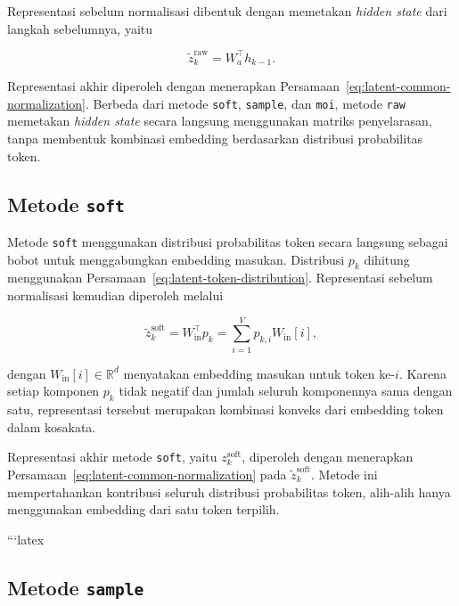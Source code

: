 Representasi sebelum normalisasi dibentuk dengan memetakan
\textit{hidden state} dari langkah sebelumnya, yaitu

\begin{equation}
\widetilde z_k^{\mathrm{raw}}
=
W_a^\top h_{k-1}.
\label{eq:raw-prelatent}
\end{equation}

Representasi akhir diperoleh dengan menerapkan Persamaan~\eqref{eq:latent-common-normalization}. Berbeda dari metode \texttt{soft}, \texttt{sample}, dan
\texttt{moi}, metode \texttt{raw} memetakan \textit{hidden state}
secara langsung menggunakan matriks penyelarasan, tanpa membentuk
kombinasi embedding berdasarkan distribusi probabilitas token.

\subsection{Metode \texttt{soft}}
\label{subsec:metode-soft}

Metode \texttt{soft} menggunakan distribusi probabilitas token secara langsung sebagai bobot untuk menggabungkan embedding masukan. Distribusi $p_k$ dihitung menggunakan Persamaan~\eqref{eq:latent-token-distribution}. Representasi sebelum normalisasi kemudian diperoleh melalui

\begin{equation}
\widetilde z_k^{\mathrm{soft}}
=
W_{\mathrm{in}}^{\top}p_k
=
\sum_{i=1}^{V}
p_{k,i}W_{\mathrm{in}}[i],
\label{eq:soft-prelatent}
\end{equation}

dengan $W_{\mathrm{in}}[i]\in\mathbb{R}^{d}$ menyatakan embedding masukan untuk token ke-$i$. Karena setiap komponen $p_k$ tidak negatif dan jumlah seluruh komponennya sama dengan satu, representasi tersebut merupakan kombinasi konveks dari embedding token dalam kosakata.

Representasi akhir metode \texttt{soft}, yaitu $z_k^{\mathrm{soft}}$, diperoleh dengan menerapkan Persamaan~\eqref{eq:latent-common-normalization} pada $\widetilde z_k^{\mathrm{soft}}$. Metode ini mempertahankan kontribusi seluruh distribusi probabilitas token, alih-alih hanya menggunakan embedding dari satu token terpilih.

```latex
\subsection{Metode \texttt{sample}}
\label{subsec:metode-sample}

